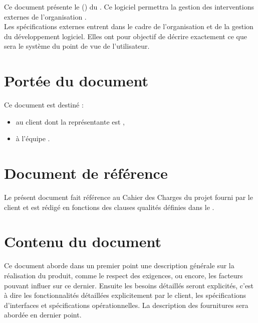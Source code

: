 Ce document présente le \DSE{} (\DSECourt) du \PIC{} \nomPIC. Ce logiciel permettra la gestion des interventions externes de l'organisation \nomClient. \\
	
	Les spécifications externes entrent dans le cadre de l'organisation et de la gestion du développement logiciel. Elles ont pour objectif de décrire exactement ce que sera le système du point de vue de l'utilisateur.
	
	
\section{Portée du document}
	Ce document est destiné :
	\begin{itemize}
		\item au client \nomClient{} dont la représentante est \representantClient,
		\item à l'équipe \PICCourt{} \nomEquipe.
	\end{itemize}
	
\section{Document de référence}
	Le présent document fait référence au Cahier des Charges du projet fourni par le client et est rédigé en fonctions des clauses qualités définies dans le \PQ.
	
\section{Contenu du document}
	Ce document aborde dans un premier point une description générale sur la réalisation du produit, comme le respect des exigences, ou encore, les facteurs pouvant influer sur ce dernier. Ensuite les besoins détaillés seront explicités, c'est à dire les fonctionnalités détaillées  explicitement par le client, les spécifications d'interfaces et spécifications opérationnelles. La description des fournitures sera abordée en dernier point.